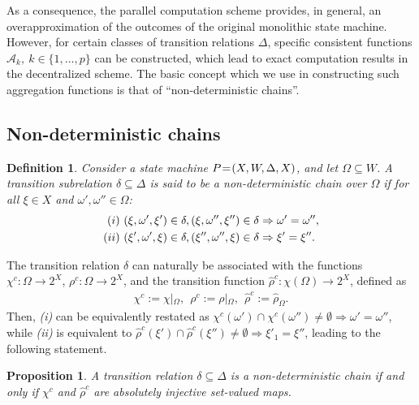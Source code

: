 \documentclass[a4paper, 10pt, conference]{ieeeconf}
\newtheorem{definition}{Definition}
\newtheorem{proposition}{Proposition}
\newcommand{\hspm}{\hspace{-2pt}}
\newcommand{\ak}{\mathcal{A}_k}
\begin{document}
As a consequence, the parallel computation scheme provides, in general, an overapproximation  of the outcomes of the original monolithic state machine. However, for certain classes of transition relations $\Delta$, specific consistent functions $\ak, ~k\in\{1,\dots,p\}$ can be constructed, which lead to exact computation results in the decentralized scheme. The basic concept which we use in constructing such aggregation functions is that of ``non-deterministic chains''.






\subsection{Non-deterministic chains}
\label{sec:Chain-structured state machines}
\begin{definition}\label{def:chain1}
Consider a state machine $P\hspm=\hspm(X,W,\Delta,X)$, and let $\Omega\subseteq W$. A transition subrelation $\delta\subseteq \Delta$ is said to be a \emph{non-deterministic chain} over $\Omega$ if for all $\xi\in X$ and $\omega', \omega'' \in \Omega$:
\vspace{-6pt}
\begin{align*}
\text(i)~ & (\xi,\omega',\xi')\in\delta, (\xi,\omega'',\xi'')\in\delta\Rightarrow \omega'=\omega'',\\
\text(ii)~ & (\xi',\omega',\xi)\in\delta, (\xi'',\omega'',\xi)\in\delta\Rightarrow \xi'=\xi''.
\end{align*}
\end{definition}
The transition relation $\delta$ can naturally be associated with the functions $\chi^c : \Omega\to 2^ X$, $\rho^c : \Omega\to 2^X$, and the transition function $\hat\rho^c: \chi(\Omega)\to 2^X$, defined as
\begin{align}\label{eq:ndc_funs}
\chi^c :=\chi|{_{\Omega}},~~\rho^c :=\rho|{_{\Omega}},~~\hat\rho^c:=\hat\rho_\Omega.
\end{align}
Then, \emph{(i)} can be equivalently restated as $\chi^c(\omega')\cap\chi^c(\omega'')\neq\emptyset\Rightarrow \omega'=\omega''$,  while \emph{(ii)} is equivalent to $\hat\rho^c(\xi')\cap\hat\rho^c(\xi'')\neq\emptyset\Rightarrow \xi'_1=\xi''$, leading to the following statement.
\begin{proposition}\label{def:chain2}
A transition relation $\delta\subseteq \Delta$ is a non-deterministic chain if and only if $\chi^c$ and $\hat\rho^c$ are absolutely injective set-valued maps.
\end{proposition}
\end{document}
